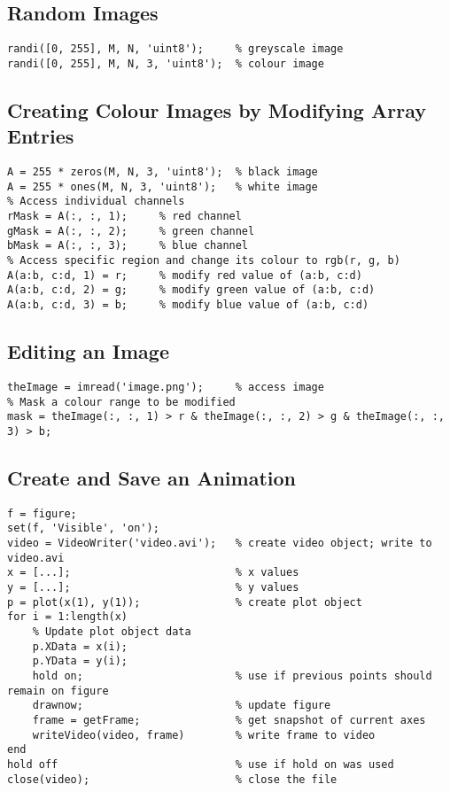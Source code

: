 \documentclass{article}
\begin{document}
\subsection*{Random Images}
\begin{lstlisting}
randi([0, 255], M, N, 'uint8');     % greyscale image
randi([0, 255], M, N, 3, 'uint8');  % colour image
\end{lstlisting}
\subsection*{Creating Colour Images by Modifying Array Entries}
\begin{lstlisting}
A = 255 * zeros(M, N, 3, 'uint8');  % black image
A = 255 * ones(M, N, 3, 'uint8');   % white image
% Access individual channels
rMask = A(:, :, 1);     % red channel
gMask = A(:, :, 2);     % green channel
bMask = A(:, :, 3);     % blue channel
% Access specific region and change its colour to rgb(r, g, b)
A(a:b, c:d, 1) = r;     % modify red value of (a:b, c:d)
A(a:b, c:d, 2) = g;     % modify green value of (a:b, c:d)
A(a:b, c:d, 3) = b;     % modify blue value of (a:b, c:d)
\end{lstlisting}
\subsection*{Editing an Image}
\begin{lstlisting}
theImage = imread('image.png');     % access image 
% Mask a colour range to be modified
mask = theImage(:, :, 1) > r & theImage(:, :, 2) > g & theImage(:, :, 3) > b;
\end{lstlisting}
\subsection*{Create and Save an Animation}
\begin{lstlisting}
f = figure;
set(f, 'Visible', 'on');
video = VideoWriter('video.avi');   % create video object; write to video.avi
x = [...];                          % x values
y = [...];                          % y values
p = plot(x(1), y(1));               % create plot object
for i = 1:length(x)
    % Update plot object data
    p.XData = x(i);
    p.YData = y(i);
    hold on;                        % use if previous points should remain on figure
    drawnow;                        % update figure
    frame = getFrame;               % get snapshot of current axes
    writeVideo(video, frame)        % write frame to video
end
hold off                            % use if hold on was used
close(video);                       % close the file
\end{lstlisting}    
\end{document}
